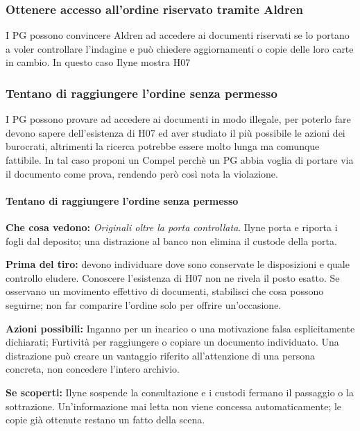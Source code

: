 \documentclass[11pt,a4paper]{article}
\newcommand{\aspect}[1]{\textit{\textcolor{blood}{#1}}}
\begin{document}
\subsubsection{Ottenere accesso all'ordine riservato tramite Aldren}
I PG possono convincere Aldren ad accedere ai documenti riservati se lo portano a voler controllare l'indagine e può chiedere aggiornamenti o copie delle loro carte in cambio. In questo caso Ilyne mostra H07

\subsubsection{Tentano di raggiungere l'ordine senza permesso}
I PG possono provare ad accedere ai documenti in modo illegale, per poterlo fare devono sapere dell'esistenza di H07 ed aver studiato il più possibile le azioni dei burocrati, altrimenti la ricerca potrebbe essere molto lunga ma comunque fattibile. In tal caso proponi un Compel perchè un PG abbia voglia di portare via il documento come prova, rendendo però così nota la violazione. 

\paragraph{Tentano di raggiungere l'ordine senza permesso}
\textbf{Che cosa vedono:} \aspect{Originali oltre la porta controllata}. Ilyne porta e riporta i fogli dal deposito; una distrazione al banco non elimina il custode della porta.

\textbf{Prima del tiro:} devono individuare dove sono conservate le disposizioni e quale controllo eludere. Conoscere l'esistenza di H07 non ne rivela il posto esatto. Se osservano un movimento effettivo di documenti, stabilisci che cosa possono seguirne; non far comparire l'ordine solo per offrire un'occasione.

\textbf{Azioni possibili:} Inganno per un incarico o una motivazione falsa esplicitamente dichiarati; Furtività per raggiungere o copiare un documento individuato. Una distrazione può creare un vantaggio riferito all'attenzione di una persona concreta, non concedere l'intero archivio.

\textbf{Se scoperti:} Ilyne sospende la consultazione e i custodi fermano il passaggio o la sottrazione. Un'informazione mai letta non viene concessa automaticamente; le copie già ottenute restano un fatto della scena.
\end{document}
